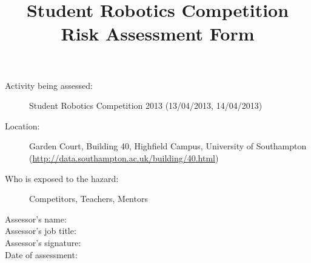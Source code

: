 \documentclass[12pt,a4paper]{scrartcl}
\title{Student Robotics Competition Risk Assessment Form}
\begin{document}
\maketitle

\begin{description}
\item[Activity being assessed:] Student Robotics Competition 2013 (13/04/2013, 14/04/2013)
\item[Location:] Garden Court, Building 40, Highfield Campus, University of Southampton (\url{http://data.southampton.ac.uk/building/40.html})
\item[Who is exposed to the hazard:] Competitors, Teachers, Mentors
\end{description}

\begin{description}
\item[Assessor's name:]
\item[Assessor's job title:]
\item[Assessor's signature:]
\item[Date of assessment:]
\end{description}
\clearpage

\newcommand{\risk}[3]{
 #1 & #2 & #3 \\
}
\end{document}
